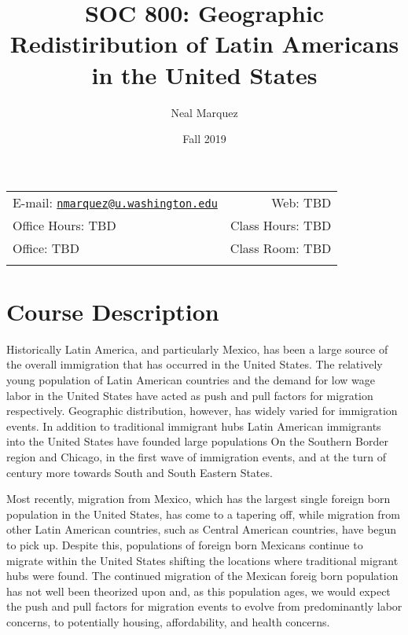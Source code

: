 \documentclass[11pt,]{article}
\title{SOC 800: Geographic Redistiribution of Latin Americans in the
United States}
\author{Neal Marquez}
\date{Fall 2019}
\begin{document}
  

		\maketitle
		
	
		\thispagestyle{firststyle}



	\noindent \begin{tabular*}{\textwidth}{ @{\extracolsep{\fill}} lr @{\extracolsep{\fill}}}


E-mail: \texttt{\href{mailto:nmarquez@u.washington.edu}{\nolinkurl{nmarquez@u.washington.edu}}} & Web: TBD\\
Office Hours: TBD  &  Class Hours: TBD\\
Office: TBD  & Class Room: TBD\\
	&  \\
	\hline
	\end{tabular*}
	
\vspace{2mm}
	


\hypertarget{course-description}{%
\section{Course Description}\label{course-description}}

Historically Latin America, and particularly Mexico, has been a large
source of the overall immigration that has occurred in the United
States. The relatively young population of Latin American countries and
the demand for low wage labor in the United States have acted as push
and pull factors for migration respectively. Geographic distribution,
however, has widely varied for immigration events. In addition to
traditional immigrant hubs Latin American immigrants into the United
States have founded large populations On the Southern Border region and
Chicago, in the first wave of immigration events, and at the turn of
century more towards South and South Eastern States.

Most recently, migration from Mexico, which has the largest single
foreign born population in the United States, has come to a tapering
off, while migration from other Latin American countries, such as
Central American countries, have begun to pick up. Despite this,
populations of foreign born Mexicans continue to migrate within the
United States shifting the locations where traditional migrant hubs were
found. The continued migration of the Mexican foreig born population has
not well been theorized upon and, as this population ages, we would
expect the push and pull factors for migration events to evolve from
predominantly labor concerns, to potentially housing, affordability, and
health concerns.
\end{document}
